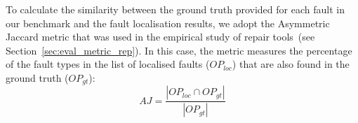 To calculate the similarity between the ground truth provided for each fault in our benchmark and the fault localisation results, we adopt the Asymmetric Jaccard metric that was used in the empirical study of repair tools~(see Section~\ref{sec:eval_metric_rep}). In this case, the metric measures the percentage of the fault types in the list of localised faults  ($OP_{loc}$) that are also found in the ground truth ($OP_{gt}$):
\begin{equation}
    AJ = \frac{| OP_{loc} \cap OP_{gt} |}{| OP_{gt} |}
\end{equation}

